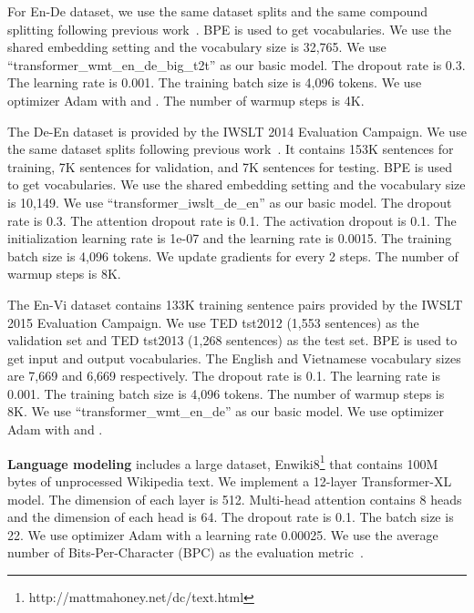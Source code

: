 \documentclass{article}
\begin{document}
  
For En-De dataset, we use the same dataset splits and the same compound splitting following previous work~\citep{DBLP:conf/nips/VaswaniSPUJGKP17}. BPE is used to get vocabularies. We use the shared embedding setting and the vocabulary size is 32,765. We use ``transformer\_wmt\_en\_de\_big\_t2t'' as our basic model.   The dropout rate is 0.3. The learning rate is 0.001. The training batch size is  4,096 tokens. We use optimizer Adam with  and .  The number of warmup steps is 4K. 



The De-En dataset is provided by the IWSLT 2014 Evaluation Campaign.  We use the same dataset splits following previous work~\citep{ott2019fairseq,DBLP:journals/corr/RanzatoCAZ15,DBLP:conf/emnlp/WisemanR16}. It contains 153K sentences for training, 7K sentences for validation, and 7K sentences for testing. BPE is used to get vocabularies. We use the shared embedding setting and the vocabulary size is 10,149. We use ``transformer\_iwslt\_de\_en'' as our basic model.  The dropout rate is 0.3. The attention dropout rate is  0.1. The activation dropout is 0.1. The initialization learning rate is 1e-07 and the learning rate is 0.0015. The training batch size is  4,096 tokens. We  update gradients for every 2 steps. The number of warmup steps is 8K. 


  The En-Vi dataset contains 133K training sentence pairs provided by the IWSLT 2015 Evaluation Campaign. We use TED
tst2012 (1,553 sentences) as the validation set  and TED tst2013 (1,268 sentences) as the test set. BPE is used to get input and output vocabularies. The English and Vietnamese vocabulary sizes are 7,669 and 6,669 respectively.  The dropout rate is 0.1. The learning rate is 0.001. The training batch size is  4,096 tokens. The number of warmup steps is 8K. We use ``transformer\_wmt\_en\_de'' as our basic model. We use optimizer Adam with  and . 







 \textbf{Language modeling} includes a large dataset, Enwiki8\footnote{http://mattmahoney.net/dc/text.html} that contains 100M bytes of unprocessed Wikipedia text. 
We implement a  12-layer Transformer-XL model. The dimension of each layer is 512. Multi-head attention contains 8 heads and the dimension of each head is 64. The dropout rate is 0.1. The batch size is 22. We use optimizer Adam with a learning rate 0.00025. 
We use the average number of Bits-Per-Character (BPC) as the evaluation metric~\citep{DBLP:journals/corr/abs-1808-04444,dai2019transformer}.  
\end{document}
